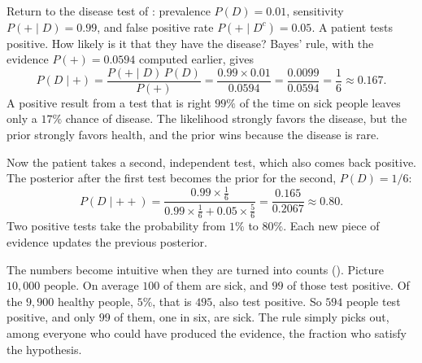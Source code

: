 \begin{example}
  \label{ex:ch05-disease}
  Return to the disease test of : prevalence
  $P(D) = 0.01$, sensitivity $P(+ \mid D) = 0.99$, and false positive
  rate $P(+ \mid D^c) = 0.05$. A patient tests positive. How likely is
  it that they have the disease? Bayes' rule, with the evidence $P(+) =
  0.0594$ computed earlier, gives
  \[
    P(D \mid +) = \frac{P(+ \mid D)\, P(D)}{P(+)}
    = \frac{0.99 \times 0.01}{0.0594} = \frac{0.0099}{0.0594}
    = \frac16 \approx 0.167 .
  \]
  A positive result from a test that is right $99\%$ of the time on sick
  people leaves only a $17\%$ chance of disease. The likelihood strongly
  favors the disease, but the prior strongly favors health, and the
  prior wins because the disease is rare.

  Now the patient takes a second, independent test, which also comes
  back positive. The posterior after the first test becomes the prior
  for the second, $P(D) = 1/6$:
  \[
    P(D \mid {+}{+}) =
    \frac{0.99 \times \frac16}{0.99 \times \frac16 + 0.05 \times \frac56}
    = \frac{0.165}{0.2067} \approx 0.80 .
  \]
  Two positive tests take the probability from $1\%$ to $80\%$. Each
  new piece of evidence updates the previous posterior.
\end{example}

The numbers become intuitive when they are turned into counts
(). Picture $10{,}000$ people. On average
$100$ of them are sick, and $99$ of those test positive. Of the $9{,}900$
healthy people, $5\%$, that is $495$, also test positive. So $594$ people
test positive, and only $99$ of them, one in six, are sick. The rule
simply picks out, among everyone who could have produced the evidence,
the fraction who satisfy the hypothesis.

